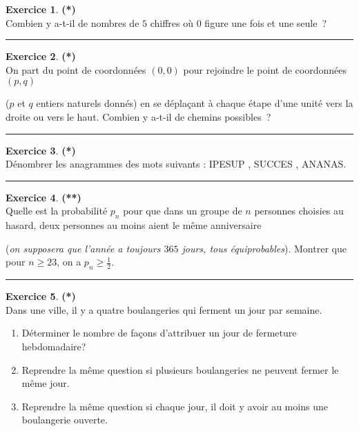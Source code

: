 \documentclass[a4paper,11pt]{article}
\theoremstyle{definition}
\newtheorem{exo}{Exercice} %
\begin{document}
   
\begin{minipage}{1\linewidth}\begin{minipage}[t]{0.48\linewidth}\raggedright
	
\begin{exo}\textbf{(*)}\quad\\[0.2cm]
Combien y a-t-il de nombres de $5$ chiffres où $0$ figure une fois et une seule~?
	
\centering\rule{1\linewidth}{0.6pt}\end{exo}


\begin{exo}\textbf{(*)}\quad\\[0.2cm]
On part du point de coordonnées $(0,0)$ pour rejoindre le point de coordonnées $(p,q)$

($p$ et $q$ entiers naturels donnés) en se déplaçant à chaque étape d'une unité vers la droite ou vers le haut. Combien y a-t-il de chemins possibles~?

\centering\rule{1\linewidth}{0.6pt}\end{exo}


\begin{exo}\textbf{(*)}\quad\\[0.2cm]
Dénombrer les anagrammes des mots suivants : IPESUP , SUCCES , ANANAS.

\centering\rule{1\linewidth}{0.6pt}\end{exo}

\begin{exo}\textbf{(**)}\quad\\[0.2cm]
Quelle est la probabilité $p_n$ pour que dans un groupe de $n$ personnes choisies au hasard, deux personnes au moins aient le même anniversaire 

(\textit{on supposera que l'année a toujours $365$ jours, tous équiprobables}). Montrer que pour $n\geq23$, on a $p_n\geq\frac{1}{2}$.

\centering\rule{1\linewidth}{0.6pt}\end{exo}


\end{minipage}\hfill\vrule\hfill\begin{minipage}[t]{0.48\linewidth}\raggedright

\begin{exo}\textbf{(*)}\quad\\[0.2cm]
Dans une ville, il y a quatre boulangeries qui ferment un jour par semaine.
\begin{enumerate}
	\item Déterminer le nombre de façons d'attribuer un jour de fermeture hebdomadaire?
	\item Reprendre la même question si plusieurs boulangeries ne peuvent fermer le même jour.
	\item Reprendre la même question si chaque jour, il doit y avoir au moins une boulangerie ouverte.
\end{enumerate}


\end{exo}
\end{minipage}
\end{minipage}
\end{document}
